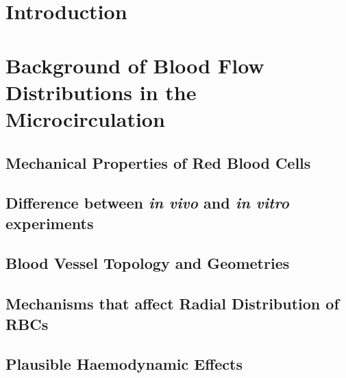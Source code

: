 \documentclass[a4paper, 11pt]{article}
\numberwithin{figure}{subsection}
\numberwithin{table}{subsection}
\begin{document}
\section{Introduction}



\newpage
\section{Background of Blood Flow Distributions in the Microcirculation}



\bigskip

\subsection{Mechanical Properties of Red Blood Cells}
\label{MechanicalPropertiesOfRBC}


\subsection{Difference between \textit{in vivo} and \textit{in vitro} experiments}
\label{DifferenceIn_Invivo_Invitro}


\subsection{Blood Vessel Topology and Geometries}
\label{Topology_Geometries}


\subsection{Mechanisms that affect Radial Distribution of RBCs}
\label{BloodFlowMechanisms}
 


\subsection{Plausible Haemodynamic Effects}
\label{HaemodynamicEffects}

\end{document}
